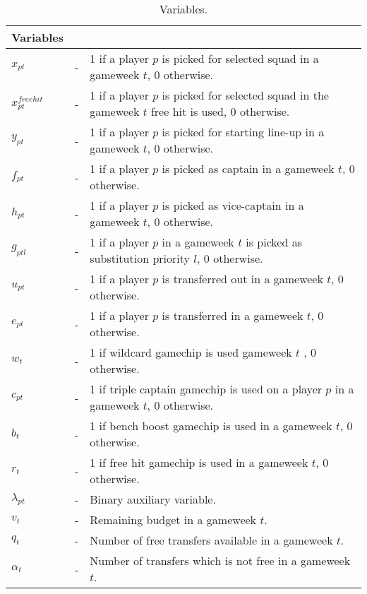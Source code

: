 \begin{table}[H]
\tabcolsep=0.11cm
\centering
\caption{Variables.}
\begin{tabular}{@{}lll@{}}
\toprule
Variables    &   &                                                                                                    \\ \midrule
${x_{pt}}$   & - & 1 if a player $p$ is picked for selected squad in a gameweek $t$, 0 otherwise.       \\
${x^{free hit}_{pt}}$   & - & 1 if a player $p$ is picked for selected squad in the gameweek $t$ free hit is used, 0 otherwise.     \\
$y_{pt}$     & - & 1 if a player $p$ is picked for starting line-up in a gameweek $t$, 0 otherwise.                    \\
$f_{pt}$     & - & 1 if a player $p$ is picked as captain in a gameweek $t$, 0 otherwise.                             \\
$h_{pt}$     & - & 1 if a player $p$ is picked as vice-captain in a gameweek $t$, 0 otherwise.                         \\
$g_{ptl}$    & - & 1 if a player $p$ in a gameweek $t$ is picked as substitution priority $l$, 0 otherwise. \\
$u_{pt}$     & - & 1 if a player $p$ is transferred out in a gameweek $t$, 0 otherwise.                               \\
$e_{pt}$     & - & 1 if a player $p$ is transferred in a gameweek $t$, 0 otherwise.                                   \\
$w_{t}$     & - & 1 if wildcard gamechip is used gameweek $t$ , 0 otherwise.                                   \\
$c_{pt}$     & - & 1 if triple captain gamechip is used on a player $p$ in a gameweek $t$, 0 otherwise.                    \\
$b_{t}$     & - & 1 if bench boost gamechip is used in a gameweek $t$, 0 otherwise.                                   \\
$r_{t}$     & - & 1 if free hit gamechip is used in a gameweek $t$, 0 otherwise.                                   \\
${\lambda_{pt}}$   & - & Binary auxiliary variable.      \\
$v_{t}$      & - & Remaining budget in a gameweek $t$.                                                                \\
$q_{t}$      & - & Number of  free transfers available in a gameweek $t$.                                             \\
$\alpha_{t}$ & - & Number of transfers which is not free in a gameweek $t$.                                      \\ \bottomrule
\end{tabular}
\end{table}
   
